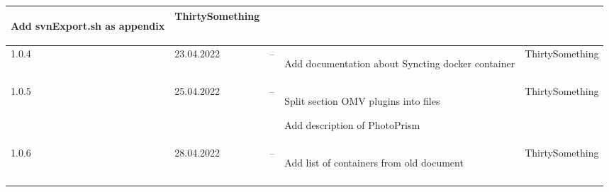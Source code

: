 \begin{tiny}
\begin{longtable}{ | p{} | p{} | p{} | P{0.49\textwidth} | p{0.15\textwidth} | }
\begin{tsLTItemize}
            \item Add svnExport.sh as appendix
        \end{tsLTItemize}
                                 &
        ThirtySomething            \\
        \hline
        1.0.4                    &
        23.04.2022               &
        --                       &
        \begin{tsLTItemize}
            \item Add documentation about Syncting docker container
        \end{tsLTItemize}
                                 &
        ThirtySomething            \\
        \hline
        1.0.5                    &
        25.04.2022               &
        --                       &
        \begin{tsLTItemize}
            \item Split section OMV plugins into files
            \item Add description of PhotoPrism
        \end{tsLTItemize}
                                 &
        ThirtySomething            \\
        \hline
        1.0.6                    &
        28.04.2022               &
        --                       &
        \begin{tsLTItemize}
            \item Add list of containers from old document
        \end{tsLTItemize}
                                 &
        ThirtySomething            \\
        \hline
    \end{longtable}
\end{tiny}
